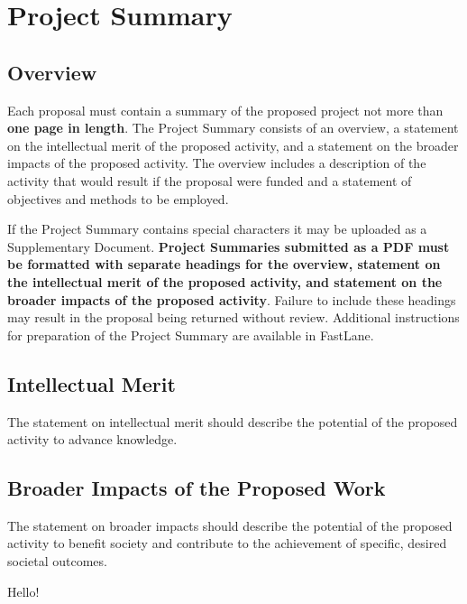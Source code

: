 \section{Project Summary}
\subsection{Overview} 
Each proposal must contain a summary of the proposed project not more than {\bf one page in length}. The Project
Summary consists of an overview, a statement on the intellectual merit of the proposed activity, and a statement
on the broader impacts of the proposed activity.
The overview includes a description of the activity that would result if the proposal were funded and a statement
of objectives and methods to be employed.  

If the Project Summary contains special characters it may be uploaded as a Supplementary Document.
{\bf Project Summaries submitted as a PDF must be formatted with separate headings for the overview, statement on the
intellectual merit of the proposed activity, and statement on the broader impacts of the proposed activity}. Failure
to include these headings may result in the proposal being returned without review.
Additional instructions for preparation of the Project Summary are available in FastLane.\\
\subsection{Intellectual Merit} 
The statement on intellectual merit should describe the potential of the proposed activity to advance knowledge.
\subsection{Broader Impacts of the Proposed Work} 
The statement on broader impacts should describe the potential of the proposed activity to benefit society and contribute to the achievement of specific, desired societal outcomes.

Hello!